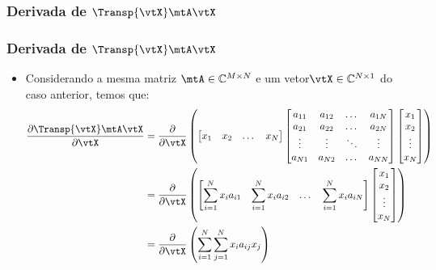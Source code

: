 \subsubsection{Derivada de $\Transp{\vtX} \mtA \vtX$}
\begin{frame}
	\frametitle{\normalsize Derivada de $\Transp{\vtX} \mtA \vtX$}
	\begin{itemize}
		\item Considerando a mesma matriz $\mtA \in \mathbb{C}^{M \times N}$ e um vetor$\vtX \in \mathbb{C}^{N \times 1}$ do caso anterior, temos que:
		{\tiny
		\begin{align*}
			\frac{\partial \Transp{\vtX} \mtA \vtX}{\partial \vtX} &= \frac{\partial}{\partial \vtX} \left(
				\begin{bmatrix}
					x_{1} & x_{2} & \dots & x_{N}
				\end{bmatrix}
				\begin{bmatrix}
					a_{11} & a_{12} & \dots & a_{1N} \\
					a_{21} & a_{22} & \dots & a_{2N} \\
					\vdots & \vdots & \ddots & \vdots \\
					a_{N1} & a_{N2} & \dots & a_{NN} \\
				\end{bmatrix} \begin{bmatrix}
					x_{1} \\ x_{2} \\ \vdots \\ x_{N}
				\end{bmatrix} \right) \\
			&= \frac{\partial}{\partial \vtX} \left(
			\begin{bmatrix}
				\displaystyle \sum_{i = 1}^{N} x_{i}a_{i1} & 
				\displaystyle \sum_{i = 1}^{N} x_{i}a_{i2} & 
				\dots & 
				\displaystyle \sum_{i = 1}^{N} x_{i}a_{iN}
			\end{bmatrix} \begin{bmatrix}
				x_{1} \\ x_{2} \\ \vdots \\ x_{N}
			\end{bmatrix} \right) \\
			&= \dfrac{\partial}{\partial \vtX} \left(
				\sum_{i = 1}^{N}\sum_{j = 1}^{N} x_{i} a_{ij} x_{j}
			\right) 
		\end{align*}}
	\end{itemize}
\end{frame}

